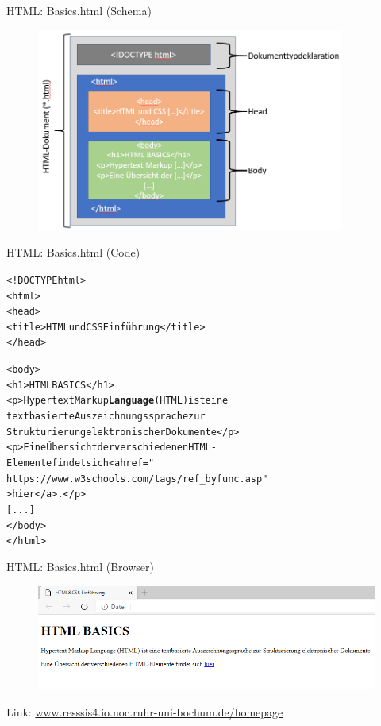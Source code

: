 \documentclass[xcolor=dvipsnames]{beamer}\usepackage[]{graphicx}\usepackage[]{color}
\makeatletter
\newcommand{\hlkwd}[1]{\textcolor[rgb]{0.737,0.353,0.396}{\textbf{#1}}}%
\newenvironment{kframe}{%
 \def\at@end@of@kframe{}%
 \ifinner\ifhmode%
  \def\at@end@of@kframe{\end{minipage}}%
  \begin{minipage}{\columnwidth}%
 \fi\fi%
 \def\FrameCommand##1{\hskip\@totalleftmargin \hskip-\fboxsep
 \colorbox{shadecolor}{##1}\hskip-\fboxsep
     \hskip-\linewidth \hskip-\@totalleftmargin \hskip\columnwidth}%
 \MakeFramed {\advance\hsize-\width
   \@totalleftmargin\z@ \linewidth\hsize
   \@setminipage}}%
 {\par\unskip\endMakeFramed%
 \at@end@of@kframe}
\newenvironment{knitrout}{}{} %
\makeatother
\begin{document}
\begin{frame}{HTML: Basics.html (Schema)}
  \begin{figure}
  	\centering
  	\includegraphics[width=0.9\textwidth]{figure/BasicHtml(Schema).png}
  	\\
  \end{figure}
\end{frame}


\begin{frame}[fragile]{HTML: Basics.html (Code)}
\begin{knitrout}\tiny
{}\color{fgcolor}\begin{kframe}
\begin{alltt}
<!DOCTYPE html>
  <html>
    <head>
      <title>HTML und CSS Einführung</title>
    </head>
  
    <body>
      <h1>HTML BASICS</h1>
      <p>Hypertext Markup \hlkwd{Language} (HTML) ist eine
         textbasierte Auszeichnungssprache zur 
         Strukturierung elektronischer Dokumente</p>
      <p>Eine Übersicht der verschiedenen HTML-
         Elemente findet sich <a href="
         https://www.w3schools.com/tags/ref_byfunc.asp"
         >hier</a>.</p>
      [...]
    </body>
  </html>
\end{alltt}
\end{kframe}
\end{knitrout}
\end{frame}


\begin{frame}{HTML: Basics.html (Browser)}
  \begin{figure}
  	\centering
  	\includegraphics[width=1\textwidth]{figure/BasicHtml(Browser).png}
  \end{figure}
  Link: \href{www.resssis4.io.noc.ruhr-uni-bochum.de/homepage}{www.resssis4.io.noc.ruhr-uni-bochum.de/homepage} 
\end{frame}
\end{document}
